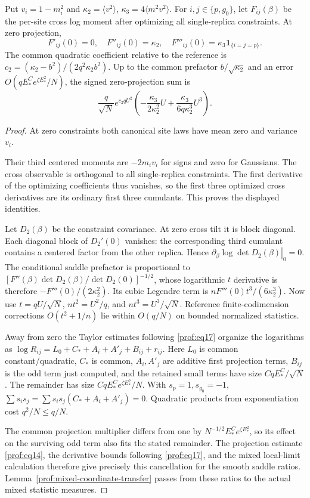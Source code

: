 \begin{lemma}\label{prof:surviving-coefficients}
Put $v_i=1-m_i^2$ and
$\kappa_2=\langle v^2\rangle$, $\kappa_3=4\langle m^2v^2\rangle$.
For $i,j\in\{p,g_0\}$, let $F_{ij}(\beta)$ be the per-site cross
log moment after optimizing all single-replica constraints. At zero projection,
\[
 F'_{ij}(0)=0,\quad F''_{ij}(0)=\kappa_2,\quad
 F'''_{ij}(0)=\kappa_3\mathbf1_{\{i=j=p\}}.
\]
The common quadratic coefficient relative to the reference is
$c_2=(\kappa_2-b^2)/(2q^2\kappa_2b^2)$. Up to the common prefactor
$b/\sqrt{\kappa_2}$ and an error $O(qE_*^Ce^{\zeta E_*^2}/N)$,
the signed zero-projection sum is
\[
 \frac{q}{\sqrt N}e^{c_2qU^2}
 \left(-\frac{\kappa_3}{2\kappa_2^2}U+\frac{\kappa_3}{6q\kappa_2^3}U^3\right).
\]
\end{lemma}
\begin{proof}
At zero constraints both canonical site laws have mean zero and
variance $v_i$.

Their third centered moments are $-2m_iv_i$ for
signs and zero for Gaussians. The cross observable is orthogonal
to all single-replica constraints. The first derivative of the
optimizing coefficients thus vanishes, so the first three
optimized cross derivatives are its ordinary first three
cumulants. This proves the displayed identities.

Let $D_2(\beta)$ be the constraint covariance. At zero cross tilt
it is block diagonal. Each diagonal block of $D_2'(0)$ vanishes:
the corresponding third cumulant contains a centered factor from
the other replica. Hence
$\left.\partial_\beta\log\det D_2(\beta)\right|_0=0$.
The conditional saddle prefactor is proportional to
$[F''(\beta)\det D_2(\beta)/\det D_2(0)]^{-1/2}$, whose
logarithmic $t$ derivative is therefore $-F'''(0)/(2\kappa_2^2)$.
Its cubic Legendre term is $nF'''(0)t^3/(6\kappa_2^3)$.
Now use $t=qU/\sqrt N$, $nt^2=U^2/q$, and
$nt^3=U^3/\sqrt N$. Reference finite-codimension corrections
$O(t^2+1/n)$ lie within $O(q/N)$ on bounded normalized statistics.

Away from zero the Taylor estimates following \eqref{prof:eq17} organize the logarithms as
$\log R_{ij}=L_0+C_*+A_i+A'_j+B_{ij}+r_{ij}$.
Here $L_0$ is common constant/quadratic, $C_*$ is common,
$A_i,A'_j$ are additive first projection terms, $B_{ij}$ is the
odd term just computed, and the retained small terms have size
$CqE_*^C/\sqrt N$. The remainder has size
$CqE_*^Ce^{\zeta E_*^2}/N$. With $s_p=1,s_{g_0}=-1$,
$\sum s_is_j=\sum s_is_j(C_*+A_i+A'_j)=0$.
Quadratic products from exponentiation cost $q^2/N\le q/N$.

The common projection multiplier differs from one by
$N^{-1/2}E_*^Ce^{\zeta E_*^2}$, so its effect on the surviving
odd term also fits the stated remainder. The projection estimate \eqref{prof:eq14}, the derivative bounds
following \eqref{prof:eq17}, and the mixed local-limit calculation
therefore give precisely this cancellation for the smooth saddle
ratios. Lemma~\ref{prof:mixed-coordinate-transfer} passes from these
ratios to the actual mixed statistic measures.
\end{proof}

